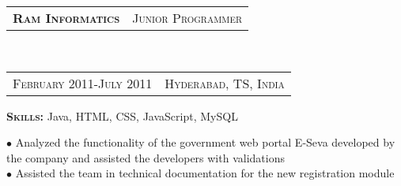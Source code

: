 \documentclass[10pt,a4paper,oneside]{article}
\begin{document}
\begin{minipage}[t]{0.4\textwidth}
        \begin{tabular}{c|c}
            \textbf{\normalsize R\textsc{am} I\textsc{nformatics}}
            &\textmd{\normalsize J\textsc{unior} P\textsc{rogrammer}}
        \end{tabular}\\
        \textcolor{light-gray}{
            \begin{tabular}{c|c}
                {\small F\textsc{ebruary 2011}-J\textsc{uly 2011}}
                &{\small H\textsc{yderabad}, T\textsc{S}, I\textsc{ndia}}
            \end{tabular}
        }
        \vspace{2mm}
        \begin{adjustwidth}{7pt}{0pt}
            \textbf{S\textsc{kills: }} \small{Java, HTML, CSS, JavaScript, MySQL}
        \end{adjustwidth}
        \vspace{1mm}
        \begin{adjustwidth}{7pt}{0pt}
            {\footnotesize $\bullet$ Analyzed the functionality of the government web portal E-Seva developed by the company and assisted the developers with validations \\
            $\bullet$ Assisted the team in technical documentation for the new registration module}\\
        \end{adjustwidth}        
        

\end{minipage}
\end{document}
